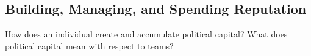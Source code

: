 \subsection{Building, Managing, and Spending Reputation}

How does an individual create and accumulate political capital? What does political capital mean with respect to teams?